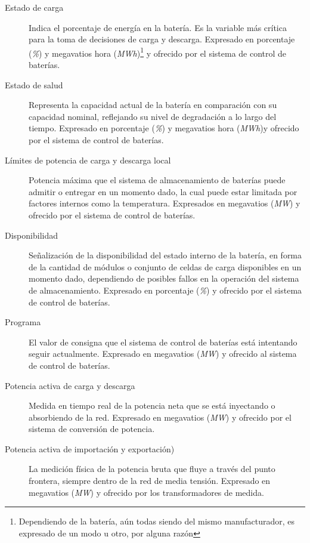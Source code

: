 \begin{description}

\item[Estado de carga] Indica el porcentaje de energía en la batería. Es la variable más crítica para la toma de decisiones de carga y descarga. Expresado en porcentaje (\textit{\%}) y megavatios hora (\textit{MWh})\footnote{Dependiendo de la batería, aún todas siendo del mismo manufacturador, es expresado de un modo u otro, por alguna razón} y ofrecido por el sistema de control de baterías.

\item[Estado de salud] Representa la capacidad actual de la batería en comparación con su capacidad nominal, reflejando su nivel de degradación a lo largo del tiempo. Expresado en porcentaje (\textit{\%}) y megavatios hora (\textit{MWh})\footnotemark[\value{footnote}] y ofrecido por el sistema de control de baterías.

\item[Límites de potencia de carga y descarga local] Potencia máxima que el sistema de almacenamiento de baterías puede admitir o entregar en un momento dado, la cual puede estar limitada por factores internos como la temperatura. Expresados en megavatios (\textit{MW}) y ofrecido por el sistema de control de baterías.

\item[Disponibilidad] Señalización de la disponibilidad del estado interno de la batería, en forma de la cantidad de módulos o conjunto de celdas de carga disponibles en un momento dado, dependiendo de posibles fallos en la operación del sistema de almacenamiento. Expresado en porcentaje (\textit{\%}) y ofrecido por el sistema de control de baterías.

\item[Programa] El valor de consigna que el sistema de control de baterías está intentando seguir actualmente. Expresado en megavatios (\textit{MW}) y ofrecido al sistema de control de baterías.

\item[Potencia activa de carga y descarga] Medida en tiempo real de la potencia neta que se está inyectando o absorbiendo de la red. Expresado en megavatios (\textit{MW}) y ofrecido por el sistema de conversión de potencia.

\item[Potencia activa de importación y exportación)] La medición física de la potencia bruta que fluye a través del punto frontera, siempre dentro de la red de media tensión. Expresado en megavatios (\textit{MW}) y ofrecido por los transformadores de medida.


\end{description}
